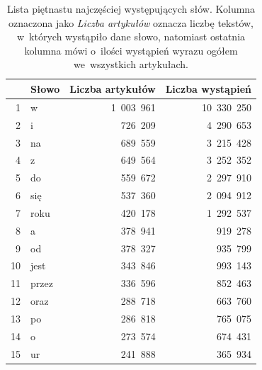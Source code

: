 \documentclass{praca1}
\begin{document}
\begin{table}[!h]
\centering
\caption{Lista piętnastu najczęściej występujących słów. Kolumna oznaczona jako \emph{Liczba artykułów} oznacza liczbę tekstów, w~których wystąpiło dane słowo, natomiast ostatnia kolumna mówi o~ilości wystąpień wyrazu ogółem we~wszystkich artykułach.} 
\begin{tabular}{|r|l|r|r|}
  \hline
 & Słowo & Liczba artykułów & Liczba wystąpień \\ 
  \hline
1 & w~& 1\ 003\ 961 & 10\ 330\ 250 \\ 
  2 & i~& 726\ 209 & 4\ 290\ 653 \\ 
  3 & na~& 689\ 559 & 3\ 215\ 428 \\ 
  4 & z~& 649\ 564 & 3\ 252\ 352 \\ 
  5 & do~& 559\ 672 & 2\ 297\ 910 \\ 
  6 & się & 537\ 360 & 2\ 094\ 912 \\ 
  7 & roku & 420\ 178 & 1\ 292\ 537 \\ 
  8 & a~& 378\ 941 & 919\ 278 \\ 
  9 & od~& 378\ 327 & 935\ 799 \\ 
  10 & jest & 343\ 846 & 993\ 143 \\ 
  11 & przez & 336\ 596 & 852\ 463 \\ 
  12 & oraz & 288\ 718 & 663\ 760 \\ 
  13 & po~& 286\ 818 & 765\ 075 \\ 
  14 & o~& 273\ 574 & 674\ 431 \\ 
  15 & ur~& 241\ 888 & 365\ 934 \\ 
   \hline
\end{tabular}
\label{tab:001}
\end{table}
\end{document}
